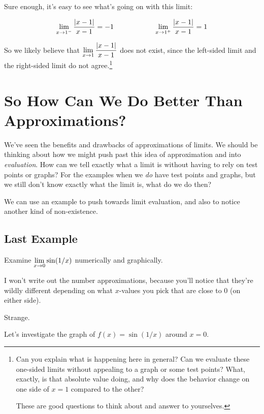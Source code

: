 \begin{enumerate}
  Sure enough, it's easy to see what's going on with this limit:

  $$\displaystyle \lim_{x\to1^-} \dfrac{|x-1|}{x-1} = -1 \hspace{2cm}\displaystyle \lim_{x\to1^+} \dfrac{|x-1|}{x-1} = 1$$

  So we likely believe that $\displaystyle \lim_{x\to1} \dfrac{|x-1|}{x-1}$ does not exist, since the left-sided limit and the right-sided limit do not agree.\footnote{Can you explain what is happening here in general?
  Can we evaluate these one-sided limits without appealing to a graph or some test points?
  What, exactly, is that absolute value doing, and why does the behavior change on one side of $x=1$ compared to the other?

  These are good questions to think about and answer to yourselves.}
\end{enumerate}

\section*{So How Can We Do Better Than Approximations?}

We've seen the benefits and drawbacks of approximations of limits.
We should be thinking about how we might push past this idea of approximation and into \textit{evaluation}.
How can we tell exactly what a limit is without having to rely on test points or graphs?
For the examples when we \textit{do} have test points and graphs, but we still don't know exactly what the limit is, what do we do then?

We can use an example to push towards limit evaluation, and also to notice another kind of non-existence.

\subsection*{Last Example}

Examine $\displaystyle \lim_{x\to 0} \sin(1/x)$ numerically and graphically.

I won't write out the number approximations, because you'll notice that they're wildly different depending on what $x$-values you pick that are close to $0$ (on either side).

Strange.

Let's investigate the graph of $f(x) = \sin(1/x)$ around $x=0$.

